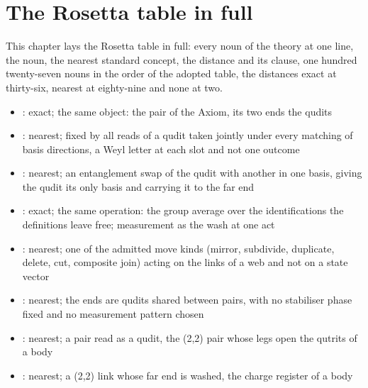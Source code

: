 \section{The Rosetta table in full}\label{mod:I-7-rosetta-table-in-full}
\begin{chtable}
This chapter lays the Rosetta table in full: every noun of the theory at one line, the noun, the nearest standard concept, the distance and its clause, one hundred twenty-seven nouns in the order of the adopted table, the distances exact at thirty-six, nearest at eighty-nine and none at two.
\end{chtable}
\chdeps{}{}
\begin{chtheorem}
\begin{itemize}
\item {}: exact; the same object: the pair of the Axiom, its two ends the qudits
\item {}: nearest; fixed by all reads of a qudit taken jointly under every matching of basis directions, a Weyl letter at each slot and not one outcome
\item {}: nearest; an entanglement swap of the qudit with another in one basis, giving the qudit its only basis and carrying it to the far end
\item {}: exact; the same operation: the group average over the identifications the definitions leave free; measurement as the wash at one act
\item {}: nearest; one of the admitted move kinds (mirror, subdivide, duplicate, delete, cut, composite join) acting on the links of a web and not on a state vector
\item {}: nearest; the ends are qudits shared between pairs, with no stabiliser phase fixed and no measurement pattern chosen
\item {}: nearest; a pair read as a qudit, the (2,2) pair whose legs open the qutrits of a body
\item {}: nearest; a (2,2) link whose far end is washed, the charge register of a body

\end{itemize}
\end{chtheorem}
